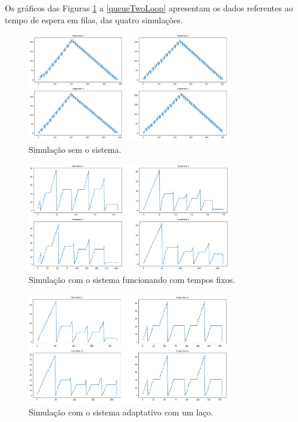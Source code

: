 Os gráficos das Figuras \ref{queueNoTL} a \ref{queueTwoLoop}  apresentam os dados referentes ao tempo de espera em filas, das quatro simulações.

\begin{figure}[H]
    \begin{center}
    \includegraphics[width=0.8\textwidth]{figuras/Queue_Duration_No_TrafficLight.PNG}
    \end{center}
    \caption[Duração das filas, cenário 1]{Simulação sem o sistema.}
    \label{queueNoTL}
\end{figure}

\begin{figure}[H]
    \begin{center}
    \includegraphics[width=0.8\textwidth]{figuras/Queue_Duration_With_TrafficLight.PNG}
    \end{center}
    \caption[Duração das filas, cenário 2]{Simulação com o sistema funcionando com tempos fixos.}
    \label{queueWithTL}
\end{figure}

\begin{figure}[H]
    \begin{center}
    \includegraphics[width=0.8\textwidth]{figuras/Queue_Duration_With_One_Loop.PNG}
    \end{center}
    \caption[Duração das filas, cenário 3]{Simulação com o sistema adaptativo com um laço.}
    \label{queueOneLoop}
\end{figure}

